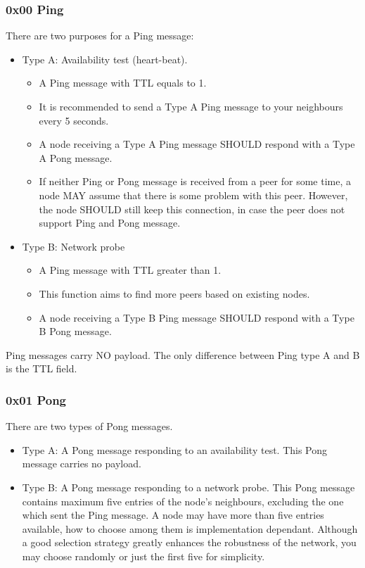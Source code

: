\documentclass[12pt, a4paper]{article}
\begin{document}
\subsubsection{0x00 Ping}
There are two purposes for a Ping message:
\begin{itemize}
\item Type A: Availability test (heart-beat).
\begin{itemize}
\item A Ping message with TTL equals to 1.
\item It is recommended to send a Type A Ping message to your neighbours every 5 seconds.
\item A node receiving a Type A Ping message SHOULD respond with a Type A Pong message.
\item If neither Ping or Pong message is received from a peer for some time, a node MAY assume that there is some problem with this peer.
However, the node SHOULD still keep this connection, in case the peer does not support Ping and Pong message.
\end{itemize}
\item Type B: Network probe
\begin{itemize}
\item A Ping message with TTL greater than 1.
\item This function aims to find more peers based on existing nodes.
\item A node receiving a Type B Ping message SHOULD respond with a Type B Pong message. 
\end{itemize}
\end{itemize}

Ping messages carry NO payload.
The only difference between Ping type A and B is the TTL field.

\subsubsection{0x01 Pong}
There are two types of Pong messages.

\begin{itemize}
\item Type A: A Pong message responding to an availability test.
This Pong message carries no payload.
\item Type B: A Pong message responding to a network probe.
This Pong message contains maximum five entries of the node's neighbours, excluding the one which sent the Ping message.
A node may have more than five entries available, how to choose among them is implementation dependant.
Although a good selection strategy greatly enhances the robustness of the network, you may choose randomly or just the first five for simplicity.
\end{itemize}
\end{document}
